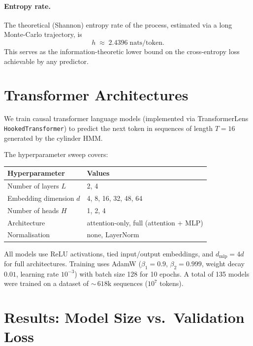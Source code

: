 \documentclass[11pt]{article}
\begin{document}
\paragraph{Entropy rate.}
The theoretical (Shannon) entropy rate of the process, estimated via a
long Monte-Carlo trajectory, is
\begin{equation}
  h \;\approx\; 2.4396 \;\text{nats/token}.
\end{equation}
This serves as the information-theoretic lower bound on the
cross-entropy loss achievable by any predictor.

\section{Transformer Architectures}

We train causal transformer language models (implemented via
TransformerLens \texttt{HookedTransformer}) to predict the next token in
sequences of length $T = 16$ generated by the cylinder HMM.

The hyperparameter sweep covers:
\begin{center}
\begin{tabular}{ll}
  \toprule
  Hyperparameter & Values \\
  \midrule
  Number of layers $L$        & 2, 4 \\
  Embedding dimension $d$     & 4, 8, 16, 32, 48, 64 \\
  Number of heads $H$         & 1, 2, 4 \\
  Architecture                & attention-only, full (attention + MLP) \\
  Normalisation               & none, LayerNorm \\
  \bottomrule
\end{tabular}
\end{center}
All models use ReLU activations, tied input/output embeddings, and
$d_{\mathrm{mlp}} = 4d$ for full architectures.  Training uses AdamW
($\beta_1 = 0.9$, $\beta_2 = 0.999$, weight decay $0.01$, learning rate
$10^{-3}$) with batch size 128 for 10 epochs.  A total of 135 models
were trained on a dataset of ${\sim}\,618\text{k}$ sequences
($10^7$ tokens).

\section{Results: Model Size vs.\ Validation Loss}
\end{document}
